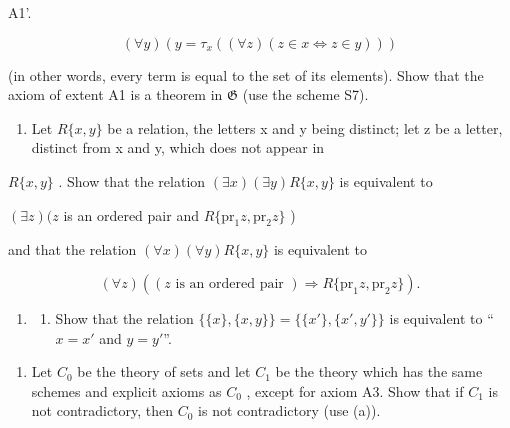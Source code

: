 A1'.

\[
(\forall y) (y = \tau_ {x} ((\forall z) (z \in x \Longleftrightarrow z \in y)))
\]

(in other words, every term is equal to the set of its elements). Show that the axiom of extent A1 is a theorem in \(\mathfrak{G}\) (use the scheme S7).

\exercisegroup

\begin{enumerate}
\def\labelenumi{\arabic{enumi}.}
\tightlist
\item
  Let \(R\{x, y\}\) be a relation, the letters x and y being distinct; let z be a letter, distinct from x and y, which does not appear in
\end{enumerate}

\(R\{x, y\}\) . Show that the relation \((\exists x)(\exists y)R\{x, y\}\) is equivalent to

\((\exists z)(z\) is an ordered pair and \(R\{\mathrm{pr}_1z, \mathrm{pr}_2z\}\) )

and that the relation \((\forall x)(\forall y)R\{x, y\}\) is equivalent to

\[
(\forall z) ((z \text {   is   an   ordered   pair }) \Longrightarrow R \{\mathrm{pr} _ {1} z, \mathrm{pr} _ {2} z \}).
\]

\begin{enumerate}
\def\labelenumi{\arabic{enumi}.}
\setcounter{enumi}{1}
\tightlist
\item
  \begin{enumerate}
  \def\labelenumii{(\alph{enumii})}
  \tightlist
  \item
    Show that the relation \(\{\{x\}, \{x, y\}\} = \{\{x'\}, \{x', y'\}\}\) is equivalent to ``\(x = x'\) and \(y = y'\)''.
  \end{enumerate}
\end{enumerate}

\begin{enumerate}
\def\labelenumi{(\alph{enumi})}
\setcounter{enumi}{1}
\tightlist
\item
  Let \(C_{0}\) be the theory of sets and let \(C_{1}\) be the theory which has the same schemes and explicit axioms as \(C_{0}\) , except for axiom A3. Show that if \(C_{1}\) is not contradictory, then \(C_{0}\) is not contradictory (use (a)).
\end{enumerate}

\exercisegroup


